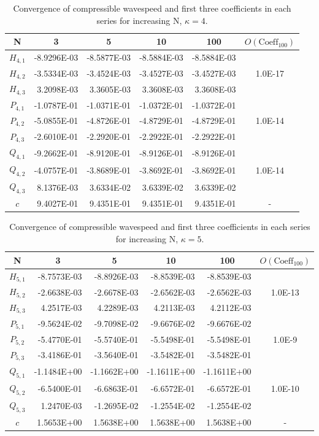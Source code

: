 \begin{table}[htbp]
	\centering
		\begin{tabular}{|c|r|r|r|r|c|} \hline
		N&\multicolumn{1}{|c|}{3}&\multicolumn{1}{|c|}{5}&\multicolumn{1}{|c|}{10}&
		\multicolumn{1}{|c|}{100}&$O(\text{Coeff}_{100})$ \\
		\hline
		$H_{4,1}$ &-8.9296E-03&-8.5877E-03&-8.5884E-03&-8.5884E-03&\\
		$H_{4,2}$ &-3.5334E-03&-3.4524E-03&-3.4527E-03&-3.4527E-03&1.0E-17 \\
		$H_{4,3}$ &3.2098E-03&3.3605E-03&3.3608E-03&3.3608E-03& \\ \hline
		$P_{4,1}$ &-1.0787E-01&-1.0371E-01&-1.0372E-01&-1.0372E-01& \\
		$P_{4,2}$ &-5.0855E-01&-4.8726E-01&-4.8729E-01&-4.8729E-01&1.0E-14\\
		$P_{4,3}$ &-2.6010E-01&-2.2920E-01&-2.2922E-01&-2.2922E-01& \\ \hline
		$Q_{4,1}$ &-9.2662E-01&-8.9120E-01&-8.9126E-01&-8.9126E-01& \\
		$Q_{4,2}$ &-4.0757E-01&-3.8689E-01&-3.8692E-01&-3.8692E-01&1.0E-14\\
		$Q_{4,3}$ &8.1376E-03&3.6334E-02&3.6339E-02&3.6339E-02& \\ \hline
	  $c$ &9.4027E-01&9.4351E-01&9.4351E-01&9.4351E-01&- \\
		\hline			
		\end{tabular}
	\caption{Convergence of compressible wavespeed and first three coefficients in each series for increasing N, $\kappa=4$.}
	\label{tab:compconverg4}
\end{table}
\begin{table}[htbp]
	\centering
		\begin{tabular}{|c|r|r|r|r|c|} \hline
		N&\multicolumn{1}{|c|}{3}&\multicolumn{1}{|c|}{5}&\multicolumn{1}{|c|}{10}&
		\multicolumn{1}{|c|}{100}&$O(\text{Coeff}_{100})$ \\
		\hline
		$H_{5,1}$ &-8.7573E-03&-8.8926E-03&-8.8539E-03&-8.8539E-03&\\
		$H_{5,2}$ &-2.6638E-03&-2.6678E-03&-2.6562E-03&-2.6562E-03&1.0E-13 \\
		$H_{5,3}$ &4.2517E-03&4.2289E-03&4.2113E-03&4.2112E-03& \\ \hline
		$P_{5,1}$ &-9.5624E-02&-9.7098E-02&-9.6676E-02&-9.6676E-02& \\
		$P_{5,2}$ &-5.4770E-01&-5.5740E-01&-5.5498E-01&-5.5498E-01&1.0E-9\\
		$P_{5,3}$ &-3.4186E-01&-3.5640E-01&-3.5482E-01&-3.5482E-01& \\ \hline
		$Q_{5,1}$ &-1.1484E+00&-1.1662E+00&-1.1611E+00&-1.1611E+00& \\
		$Q_{5,2}$ &-6.5400E-01&-6.6863E-01&-6.6572E-01&-6.6572E-01&1.0E-10\\
		$Q_{5,3}$ &1.2470E-03&-1.2695E-02&-1.2554E-02&-1.2554E-02& \\ \hline
		$c$ &1.5653E+00&1.5638E+00&1.5638E+00&1.5638E+00&- \\
		\hline			
		\end{tabular}
	\caption{Convergence of compressible wavespeed and first three coefficients in each series for increasing N, $\kappa=5$.}
	\label{tab:compconverg5}
\end{table}

